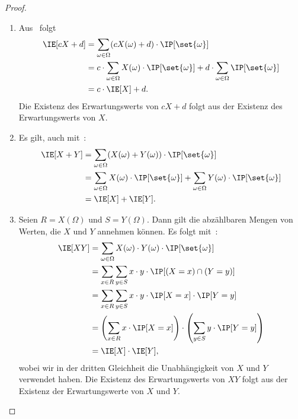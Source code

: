 \documentclass[language=ngerman,algolist]{TemplateLecture}
\begin{document}
\begin{proof}\leavevmode
    \begin{enumerate}[$(a)$:]
        \item Aus~ folgt 
        \begin{equation*}
            \begin{split}
                \IE[cX + d] &= \sum_{\omega \in \Omega} (cX(\omega) + d) \cdot \IP[\set{\omega}] \\
                &= c \cdot \sum_{\omega \in \Omega} X(\omega) \cdot \IP[\set{\omega}] + d \cdot \sum_{\omega \in \Omega} \IP[\set{\omega}] \\
                &= c \cdot \IE[X] + d.
            \end{split}
        \end{equation*}
        Die Existenz des Erwartungswerts von $cX + d$ folgt aus der Existenz des Erwartungswerts von $X$.
        \item Es gilt, auch mit~:
        \begin{equation*}
            \begin{split}
                \IE[X + Y] &= \sum_{\omega \in \Omega} (X(\omega) + Y(\omega)) \cdot \IP[\set{\omega}] \\
                &= \sum_{\omega \in \Omega} X(\omega) \cdot \IP[\set{\omega}] + \sum_{\omega \in \Omega} Y(\omega) \cdot \IP[\set{\omega}] \\
                &= \IE[X] + \IE[Y].
            \end{split}
        \end{equation*}
        \item Seien $R = X(\Omega)$ und $S = Y(\Omega)$. Dann gilt die abzählbaren Mengen von Werten, die $X$ und $Y$ annehmen können. Es folgt mit~:
        \begin{equation*}
            \begin{split}
                \IE[XY] &= \sum_{\omega \in \Omega} X(\omega) \cdot Y(\omega) \cdot \IP[\set{\omega}] \\
                &= \sum_{x \in R} \sum_{y \in S} x \cdot y \cdot \IP[(X = x) \cap (Y = y)] \\
                &= \sum_{x \in R} \sum_{y \in S} x \cdot y \cdot \IP[X = x] \cdot \IP[Y = y] \\
                &= \left( \sum_{x \in R} x \cdot \IP[X = x] \right) \cdot \left( \sum_{y \in S} y \cdot \IP[Y = y] \right) \\
                &= \IE[X] \cdot \IE[Y],
            \end{split}
        \end{equation*}
        wobei wir in der dritten Gleichheit die Unabhängigkeit von $X$ und $Y$ verwendet haben. Die Existenz des Erwartungswerts von $XY$ folgt aus der Existenz der Erwartungswerte von $X$ und $Y$.
    \end{enumerate}
\end{proof}
\end{document}
